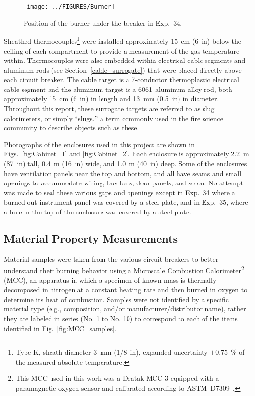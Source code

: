 \begin{figure}[ht]
\centering
\texttt{[image: ../FIGURES/Burner]}
\caption[Position of the burner] {Position of the burner under the breaker in Exp.~34.}
\label{fig:Burner}
\end{figure}

Sheathed thermocouples\footnote{Type K, sheath diameter 3~mm (1/8~in), expanded uncertainty $\pm 0.75$~\% of the measured absolute temperature.} were installed approximately 15~cm (6~in) below the ceiling of each compartment to provide a measurement of the gas temperature within. Thermocouples were also embedded within electrical cable segments and aluminum rods (see Section~\ref{cable_surrogate}) that were placed directly above each circuit breaker. The cable target is a 7-conductor thermoplastic electrical cable segment and the aluminum target is a 6061~aluminum alloy rod, both approximately  15~cm (6~in) in length and 13~mm (0.5~in) in diameter. Throughout this report, these surrogate targets are referred to as slug calorimeters, or simply ``slugs,'' a term commonly used in the fire science community to describe objects such as these.

Photographs of the enclosures used in this project are shown in Figs.~\ref{fig:Cabinet_1} and \ref{fig:Cabinet_2}. Each enclosure is approximately 2.2~m (87~in) tall, 0.4~m (16~in) wide, and 1.0~m (40~in) deep. Some of the enclosures have ventilation panels near the top and bottom, and all have seams and small openings to accommodate wiring, bus bars, door panels, and so on. No attempt was made to seal these various gaps and openings except in Exp.~34 where a burned out instrument panel was covered by a steel plate, and in Exp.~35, where a hole in the top of the enclosure was covered by a steel plate.

\subsection{Material Property Measurements}
\label{ssec:MCC}

Material samples were taken from the various circuit breakers to better understand their burning behavior using a Microscale Combustion Calorimeter\footnote{This MCC used in this work was a Deatak MCC-3 equipped with a paramagnetic oxygen sensor and calibrated according to ASTM~D7309~\cite{ASTMD7309}.} (MCC), an apparatus in which a specimen of known mass is thermally decomposed in nitrogen at a constant heating rate and then burned in oxygen to determine its heat of combustion. Samples were not identified by a specific material type (e.g., composition, and/or manufacturer/distributor name), rather they are labeled in series (No. 1 to No. 10) to correspond to each of the items identified in Fig.~\ref{fig:MCC_samples}.


